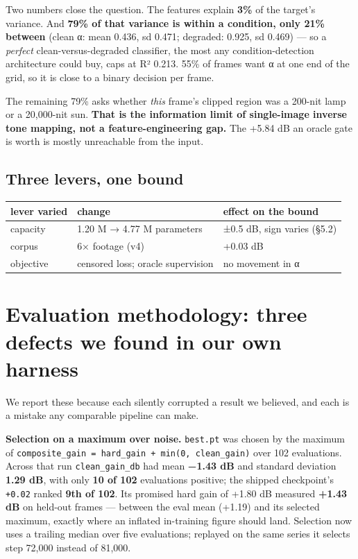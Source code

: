 Two numbers close the question. The features explain \textbf{3\%} of the target's
variance. And \textbf{79\% of that variance is within a condition, only 21\% between}
(clean α: mean 0.436, sd 0.471; degraded: 0.925, sd 0.469) --- so a \emph{perfect}
clean-versus-degraded classifier, the most any condition-detection architecture
could buy, caps at R² 0.213. 55\% of frames want α at one end of the grid, so it
is close to a binary decision per frame.

The remaining 79\% asks whether \emph{this} frame's clipped region was a 200-nit lamp
or a 20,000-nit sun. \textbf{That is the information limit of single-image inverse
tone mapping, not a feature-engineering gap.} The +5.84 dB an oracle gate is
worth is mostly unreachable from the input.

\hypertarget{three-levers-one-bound}{%
\subsection{Three levers, one bound}\label{three-levers-one-bound}}

\begin{longtable}[]{@{}lll@{}}
\toprule
lever varied & change & effect on the bound\tabularnewline
\midrule
\endhead
capacity & 1.20 M → 4.77 M parameters & ±0.5 dB, sign varies (§5.2)\tabularnewline
corpus & 6× footage (v4) & +0.03 dB\tabularnewline
objective & censored loss; oracle supervision & no movement in α\tabularnewline
\bottomrule
\end{longtable}

\hypertarget{evaluation-methodology-three-defects-we-found-in-our-own-harness}{%
\section{Evaluation methodology: three defects we found in our own harness}\label{evaluation-methodology-three-defects-we-found-in-our-own-harness}}

We report these because each silently corrupted a result we believed, and each
is a mistake any comparable pipeline can make.

\textbf{Selection on a maximum over noise.} \texttt{best.pt} was chosen by the maximum of
\texttt{composite\_gain\ =\ hard\_gain\ +\ min(0,\ clean\_gain)} over 102 evaluations. Across
that run \texttt{clean\_gain\_db} had mean \textbf{−1.43 dB} and standard deviation \textbf{1.29
dB}, with only \textbf{10 of 102} evaluations positive; the shipped checkpoint's
\texttt{+0.02} ranked \textbf{9th of 102}. Its promised hard gain of +1.80 dB measured
\textbf{+1.43 dB} on held-out frames --- between the eval mean (+1.19) and its selected
maximum, exactly where an inflated in-training figure should land. Selection now
uses a trailing median over five evaluations; replayed on the same series it
selects step 72,000 instead of 81,000.

